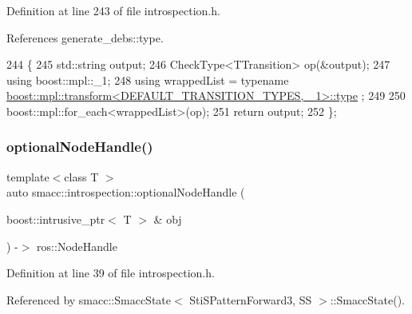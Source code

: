 Definition at line 243 of file introspection.\+h.



References generate\+\_\+debs\+::type.


\begin{DoxyCode}
244 \{
245     std::string output;
246     CheckType<TTransition> op(&output);
247     \textcolor{keyword}{using} boost::mpl::\_1;
248     \textcolor{keyword}{using} wrappedList = \textcolor{keyword}{typename} 
      \hyperlink{namespacegenerate__debs_a50bc9a7ecac9584553e089a448bcde58}{boost::mpl::transform<DEFAULT\_TRANSITION\_TYPES, \_1>::type}
      ;
249 
250     boost::mpl::for\_each<wrappedList>(op);
251     \textcolor{keywordflow}{return} output;
252 \};
\end{DoxyCode}
\mbox{\label{namespacesmacc_1_1introspection_a8acc3b4146a8b2bb0a9fa4178840e9b9}} 
\subsubsection{\texorpdfstring{optional\+Node\+Handle()}{optionalNodeHandle()}\hspace{0.1cm}{\footnotesize\ttfamily [1/2]}}
{\footnotesize\ttfamily template$<$class T $>$ \\
auto smacc\+::introspection\+::optional\+Node\+Handle (\begin{DoxyParamCaption}\item[{boost\+::intrusive\+\_\+ptr$<$ T $>$ \&}]{obj }\end{DoxyParamCaption}) -\/$>$ ros\+::\+Node\+Handle
}



Definition at line 39 of file introspection.\+h.



Referenced by smacc\+::\+Smacc\+State$<$ Sti\+S\+Pattern\+Forward3, S\+S $>$\+::\+Smacc\+State().


